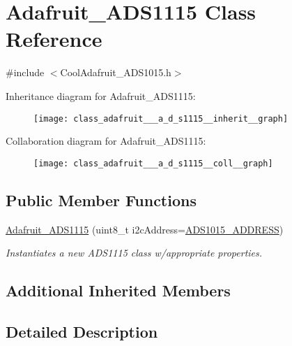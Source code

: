 \hypertarget{class_adafruit___a_d_s1115}{}\section{Adafruit\+\_\+\+A\+D\+S1115 Class Reference}
\label{class_adafruit___a_d_s1115}


{\ttfamily \#include $<$Cool\+Adafruit\+\_\+\+A\+D\+S1015.\+h$>$}



Inheritance diagram for Adafruit\+\_\+\+A\+D\+S1115\+:\nopagebreak
\begin{figure}[H]
\begin{center}
\leavevmode
\texttt{[image: class\_adafruit\_\_\_a\_d\_s1115\_\_inherit\_\_graph]}
\end{center}
\end{figure}


Collaboration diagram for Adafruit\+\_\+\+A\+D\+S1115\+:\nopagebreak
\begin{figure}[H]
\begin{center}
\leavevmode
\texttt{[image: class\_adafruit\_\_\_a\_d\_s1115\_\_coll\_\_graph]}
\end{center}
\end{figure}
\subsection*{Public Member Functions}
\begin{DoxyCompactItemize}
\item 
\hyperlink{class_adafruit___a_d_s1115_a7058cf2c75b673fb0b0a8936c3edd1fd}{Adafruit\+\_\+\+A\+D\+S1115} (uint8\+\_\+t i2c\+Address=\hyperlink{_cool_adafruit___a_d_s1015_8h_ae55d158023984e8f0ddc80b58d5b30dc}{A\+D\+S1015\+\_\+\+A\+D\+D\+R\+E\+SS})
\begin{DoxyCompactList}\small\item\em Instantiates a new A\+D\+S1115 class w/appropriate properties. \end{DoxyCompactList}\end{DoxyCompactItemize}
\subsection*{Additional Inherited Members}


\subsection{Detailed Description}


